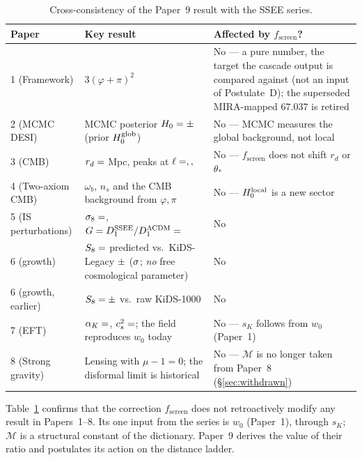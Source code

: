 \documentclass[12pt,a4paper]{article}
\newcommand{\phiG}{\varphi}
\newcommand{\MIRA}{\mathcal{M}}
\newcommand{\Hzero}{H_0}
\newcommand{\fsc}{f_{\mathrm{screen}}}
\newcommand{\sK}{s_K}          %
\begin{document}
\begin{table}[ht]
\centering
\caption{Cross-consistency of the Paper~9 result with the SSEE series.}
\label{tab:consistency}
\begin{tabularx}{\textwidth}{l p{4.5cm} X}
\toprule
Paper & Key result & Affected by $\fsc$? \\
\midrule
1 (Framework) & $3(\phiG+\pi)^2$ & No --- a pure number, the target the
               cascade output is compared against (not an input of Postulate~D); the superseded
               MIRA-mapped $67.037$ is retired \\
2 (MCMC DESI) & MCMC posterior $\Hzero = \val{h0_p2}\pm\val{h0_p2_s}$ (prior $H_0^{\rm glob}$) & No —
               MCMC measures the global background, not local \\
3 (CMB)       & $r_d = \val{rd_ssee_camb_d1}$ Mpc, peaks at $\ell=\val{p3_pico1_ssee},\val{p3_pico2_ssee},\val{p3_pico3_ssee}$ & No —
               $\fsc$ does not shift $r_d$ or $\theta_*$ \\
4 (Two-axiom CMB) & $\omega_b$, $n_s$ and the CMB background from $\phiG,\pi$ & No ---
               $H_0^{\rm local}$ is a new sector \\
5 (IS perturbations) & $\sigma_8 = \val{p3_sigma8_IS}$, $G = D_1^{\rm SSEE}/D_1^{\Lambda{\rm CDM}} = \val{p5_G}$ & No \\
6 (growth) & $S_8=\val{S8_leg_pred}$ predicted vs.\ KiDS-Legacy $\val{S8_legacy_dato}\pm\val{S8_legacy_dato_sigma}$ ($\val{S8_leg_tension}\sigma$; \emph{no} free cosmological parameter) & No \\
6 (growth, earlier) & $S_8=\val{S8_k1000_ssee}\pm\val{S8_k1000_ssee_sigma}$ vs.\ raw KiDS-1000 & No \\
7 (EFT)       & $\alpha_K = \val{alpha_K_z0_d6}$, $c_s^2 = \val{cs2_condensado_d6}$; the field reproduces $w_0$ today & No ---
               $s_K$ follows from $w_0$ (Paper~1) \\
8 (Strong gravity) & Lensing with $\mu-1=0$; the disformal limit is historical & No ---
               $\MIRA$ is no longer taken from Paper~8 (§\ref{sec:withdrawn}) \\
\bottomrule
\end{tabularx}
\end{table}

Table~\ref{tab:consistency} confirms that the correction $\fsc$ does not
retroactively modify any result in Papers~1--8.
Its one input from the series is $w_0$ (Paper~1), through $\sK$; $\MIRA$ is a
structural constant of the dictionary. Paper~9 derives the value of their ratio and
postulates its action on the distance ladder.
\end{document}
